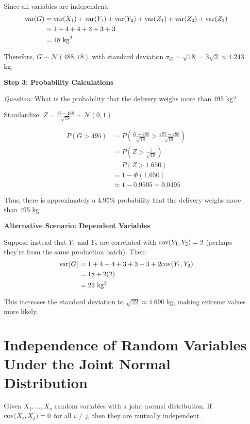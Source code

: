 Since all variables are independent:
\begin{align*}
    \mathrm{var}(G) &= \mathrm{var}(X_1) + \mathrm{var}(Y_1) + \mathrm{var}(Y_2) + \mathrm{var}(Z_1) + \mathrm{var}(Z_2) + \mathrm{var}(Z_3) \\
    &= 1 + 4 + 4 + 3 + 3 + 3 \\
    &= 18 \text{ kg}^2
\end{align*}

Therefore, \(G \sim \mathcal{N}(488, 18)\) with standard deviation \(\sigma_G = \sqrt{18} = 3\sqrt{2} \approx 4.243\) kg.

\textbf{Step 3: Probability Calculations}

\textit{Question:} What is the probability that the delivery weighs more than 495 kg?

Standardize: \(Z = \frac{G - 488}{\sqrt{18}} \sim \mathcal{N}(0,1)\)

\begin{align*}
    P(G > 495) &= P\left(\frac{G - 488}{\sqrt{18}} > \frac{495 - 488}{\sqrt{18}}\right) \\
    &= P\left(Z > \frac{7}{\sqrt{18}}\right) \\
    &= P(Z > 1.650) \\
    &= 1 - \Phi(1.650) \\
    &\approx 1 - 0.9505 = 0.0495
\end{align*}

Thus, there is approximately a 4.95\% probability that the delivery weighs more than 495 kg.

\textbf{Alternative Scenario: Dependent Variables}

Suppose instead that \(Y_1\) and \(Y_2\) are correlated with \(\mathrm{cov}(Y_1, Y_2) = 2\) (perhaps they're from the same production batch). Then:
\begin{align*}
    \mathrm{var}(G) &= 1 + 4 + 4 + 3 + 3 + 3 + 2\mathrm{cov}(Y_1, Y_2) \\
    &= 18 + 2(2) \\
    &= 22 \text{ kg}^2
\end{align*}

This increases the standard deviation to \(\sqrt{22} \approx 4.690\) kg, making extreme values more likely.

\section{Independence of Random Variables Under the Joint Normal Distribution}

Given \(X_1, \dots, X_n\) random variables with a joint normal distribution. If \(\mathrm{cov}(X_i, X_j) = 0\) for all \(i \ne j\), then they are mutually independent. 

